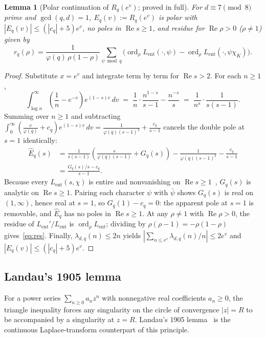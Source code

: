 \documentclass[11pt]{amsart}
\newcommand{\ord}{\operatorname{ord}}
\newcommand{\re}{\operatorname{Re}}
\newtheorem{lemma}[theorem]{Lemma}
\theoremstyle{definition}
\theoremstyle{remark}
\begin{document}
\begin{lemma}[Polar continuation of $R_q(e^v)$; proved in full]\label{lem:polar}
For $d\equiv 7\pmod 8$ prime and $\gcd(q,d)=1$, $E_q(v):=R_q(e^v)$ is polar with $|E_q(v)|\le(|c_q|+5)e^v$, no poles in $\re s\ge 1$, and residue for $\re\rho>0$ ($\rho\ne 1$) given by
\begin{equation}\label{eq:res}
 r_q(\rho)=\frac{1}{\varphi(q)\,\rho(1-\rho)}\sum_{\psi\bmod q}\bigl(\ord_\rho L_{\mathrm{ent}}(\cdot,\psi)-\ord_\rho L_{\mathrm{ent}}(\cdot,\psi\chi_K)\bigr).
\end{equation}
\end{lemma}
\begin{proof}
Substitute $x=e^v$ and integrate term by term for $\re s>2$. For each $n\ge 1$,
\[
 \int_{\log n}^{\infty}\left(\frac{1}{n}-e^{-v}\right)e^{(1-s)v}\,dv
 \;=\; \frac{1}{n}\cdot\frac{n^{1-s}}{s-1}-\frac{n^{-s}}{s}
 \;=\; \frac{1}{n^s}\cdot\frac{1}{s(s-1)}.
\]
Summing over $n\ge 1$ and subtracting $\int_0^\infty(\frac{v}{\varphi(q)}+c_q)e^{(1-s)v}\,dv=\frac{1}{\varphi(q)(s-1)^2}+\frac{c_q}{s-1}$ cancels the double pole at $s=1$ identically:
\begin{align*}
 \widehat{E}_q(s)
 &= \frac{1}{s(s-1)}\left(\frac{s}{\varphi(q)(s-1)}+G_q(s)\right)-\frac{1}{\varphi(q)(s-1)^2}-\frac{c_q}{s-1}\\
 &= \frac{G_q(s)/s-c_q}{s-1}.
\end{align*}
Because every $L_{\mathrm{ent}}(s,\chi)$ is entire and nonvanishing on $\re s\ge 1$~\cite{Hadamard,dlVP}, $G_q(s)$ is analytic on $\re s\ge 1$. Pairing each character $\psi$ with $\bar\psi$ shows $G_q(s)$ is real on $(1,\infty)$, hence real at $s=1$, so $G_q(1)-c_q=0$: the apparent pole at $s=1$ is removable, and $\widehat{E}_q$ has no poles in $\re s\ge 1$. At any $\rho\ne 1$ with $\re\rho>0$, the residue of $L_{\mathrm{ent}}'/L_{\mathrm{ent}}$ is $\ord_\rho L_{\mathrm{ent}}$; dividing by $\rho(\rho-1)=-\rho(1-\rho)$ gives~\eqref{eq:res}. Finally, $\lambda_{d,q}(n)\le 2n$ yields $|\sum_{n\le e^v}\lambda_{d,q}(n)/n|\le 2e^v$ and $|E_q(v)|\le(|c_q|+5)e^v$.
\end{proof}

\subsection{Landau's 1905 lemma}
For a power series $\sum_{n\ge 0}a_n z^n$ with nonnegative real coefficients $a_n\ge 0$, the triangle inequality forces any singularity on the circle of convergence $|z|=R$ to be accompanied by a singularity at $z=R$. Landau's 1905 lemma~\cite{Landau} is the continuous Laplace-transform counterpart of this principle.
\end{document}
